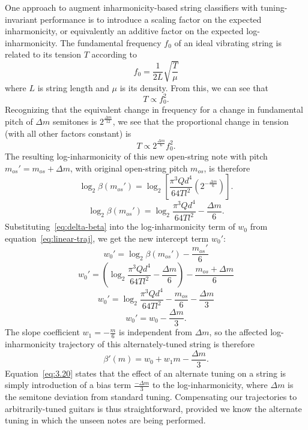 \documentclass[convention,peer-reviewed]{aesconf}
\begin{document}
One approach to augment inharmonicity-based string classifiers with tuning-invariant performance is to introduce a scaling factor on the expected inharmonicity, or equivalently an additive factor on the expected log-inharmonicity. The fundamental frequency $f_0$ of an ideal vibrating string is related to its tension $T$ according to
\begin{equation}
f_0 = \frac{1}{2L}\sqrt{\frac{T}{\mu}}
\label{eq:freq-tension}
\end{equation}
where $L$ is string length and $\mu$ is its density. From this, we can see that
\begin{equation}
T \propto f_0^{2}.
\end{equation}
Recognizing that the equivalent change in frequency for a change in fundamental pitch of $\Delta m$ semitones is $2^{\frac{\Delta m}{12}}$, we see that the proportional change in tension (with all other factors constant) is
\begin{equation}
T \propto 2^{\frac{\Delta m}{6}}f_0^2.
\end{equation}
The resulting log-inharmonicity of this new open-string note with pitch $m_{os}' = m_{os}+\Delta m$, with original open-string pitch $m_{os}$, is therefore
\begin{equation}
\log_2\beta(m_{os}') = \log_2[ \frac{\pi^3 Q d^4}{64 T l^2}(2^{-\frac{\Delta m}{6}})].
\end{equation}
\begin{equation}
\label{eq:delta-beta}
\log_2\beta(m_{os}') = \log_2\frac{\pi^3 Q d^4}{64 T l^2} - \frac{\Delta m}{6}.
\end{equation}
Substituting~\eqref{eq:delta-beta} into the log-inharmonicity term of $w_0$ from equation~\eqref{eq:linear-traj}, we get the new intercept term $w_0':$
\begin{equation}
w_{0}' = \log_2{\beta}(m_{os}') - \frac{m_{os}'}{6}
\end{equation}
\begin{equation}
w_{0}' = (\log_2\frac{\pi^3 Q d^4}{64 T l^2} - \frac{\Delta m}{6}) - \frac{m_{os}+\Delta m}{6}
\end{equation}
\begin{equation}
\label{eq:3.17}
w_{0}' = \log_2\frac{\pi^3 Q d^4}{64 T l^2} - \frac{m_{os}}{6} - \frac{\Delta m}{3}
\end{equation}
\begin{equation}
\label{eq:3.18}
w_{0}' = w_0 - \frac{\Delta m}{3}.
\end{equation}
The slope coefficient $w_1 = -\frac{m}{6}$ is independent from ${\Delta m}$, so the affected log-inharmonicity trajectory of this alternately-tuned string is therefore
\begin{equation}
\label{eq:3.20}
\beta'(m) = w_0 + w_1m - \frac{\Delta m}{3}.
\end{equation}
Equation~\eqref{eq:3.20} states that the effect of an alternate tuning on a string is simply introduction of a bias term $\frac{-\Delta m}{3}$ to the log-inharmonicity, where $\Delta m$ is the semitone deviation from standard tuning. Compensating our trajectories to arbitrarily-tuned guitars is thus straightforward, provided we know the alternate tuning in which the unseen notes are being performed. 
\end{document}
